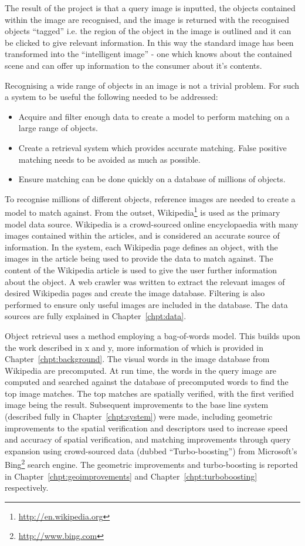 \documentclass[11pt, onecolumn, a4paper, final]{report} %
\begin{document}
The result of the project is that a query image is inputted, the objects contained within the image are recognised, and the image is returned with the recognised objects ``tagged'' i.e. the region of the object in the image is outlined and it can be clicked to give relevant information. In this way the standard image has been transformed into the ``intelligent image'' - one which knows about the contained scene and can offer up information to the consumer about it's contents.

Recognising a wide range of objects in an image is not a trivial problem. For such a system to be useful the following needed to be addressed:
\begin{itemize}
\item Acquire and filter enough data to create a model to perform matching on a large range of objects.
\item Create a retrieval system which provides accurate matching. False positive matching needs to be avoided as much as possible.
\item Ensure matching can be done quickly on a database of millions of objects.
\end{itemize}

To recognise millions of different objects, reference images are needed to create a model to match against. From the outset, Wikipedia\footnote{\url{http://en.wikipedia.org}} is used as the primary model data source. Wikipedia is a crowd-sourced online encyclopaedia with many images contained within the articles, and is considered an accurate source of information. In the system, each Wikipedia page defines an object, with the images in the article being used to provide the data to match against. The content of the Wikipedia article is used to give the user further information about the object. A web crawler was written to extract the relevant images of desired Wikipedia pages and create the image database. Filtering is also performed to ensure only useful images are included in the database. The data sources are fully explained in Chapter~\ref{chpt:data}.

Object retrieval uses a method employing a bag-of-words model. This builds upon the work described in x and y, more information of which is provided in Chapter~\ref{chpt:background}. The visual words in the image database from Wikipedia are precomputed. At run time, the words in the query image are computed and searched against the database of precomputed words to find the top image matches. The top matches are spatially verified, with the first verified image being the result. Subsequent improvements to the base line system (described fully in Chapter~\ref{chpt:system}) were made, including geometric improvements to the spatial verification and descriptors used to increase speed and accuracy of spatial verification, and matching improvements through query expansion using crowd-sourced data (dubbed ``Turbo-boosting'') from Microsoft's Bing\footnote{\url{http://www.bing.com}} search engine. The geometric improvements and turbo-boosting is reported in Chapter~\ref{chpt:geoimprovements} and Chapter~\ref{chpt:turboboosting} respectively.
\end{document}

